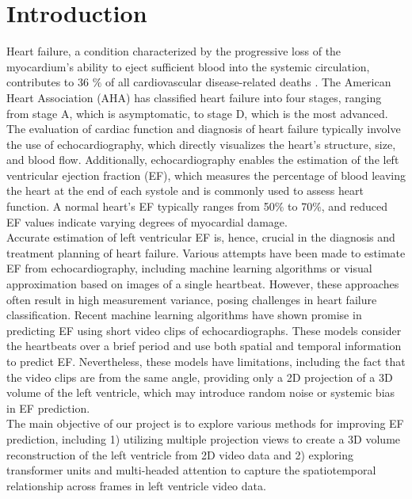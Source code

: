 \documentclass{article}
\begin{document}
\maketitle

\section{Introduction}\label{sec1}

\noindent
Heart failure, a condition characterized by the progressive loss of the myocardium's ability to eject sufficient blood into the systemic circulation, contributes to 36 $\%$ of all cardiovascular disease-related deaths \cite{heartStats}. The American Heart Association (AHA) has classified heart failure into four stages, ranging from stage A, which is asymptomatic, to stage D, which is the most advanced. The evaluation of cardiac function and diagnosis of heart failure typically involve the use of echocardiography, which directly visualizes the heart's structure, size, and blood flow. Additionally, echocardiography enables the estimation of the left ventricular ejection fraction (EF), which measures the percentage of blood leaving the heart at the end of each systole and is commonly used to assess heart function. A normal heart's EF typically ranges from 50$\%$ to 70$\%$, and reduced EF values indicate varying degrees of myocardial damage.
\\

\noindent
Accurate estimation of left ventricular EF is, hence, crucial in the diagnosis and treatment planning of heart failure. Various attempts have been made to estimate EF from echocardiography, including machine learning algorithms or visual approximation based on images of a single heartbeat. However, these approaches often result in high measurement variance, posing challenges in heart failure classification. Recent machine learning algorithms have shown promise in predicting EF using short video clips of echocardiographs. \cite{echonet1} These models consider the heartbeats over a brief period and use both spatial and temporal information to predict EF. Nevertheless, these models have limitations, including the fact that the video clips are from the same angle, providing only a 2D projection of a 3D volume of the left ventricle, which may introduce random noise or systemic bias in EF prediction.
\\

\noindent
The main objective of our project is to explore various methods for improving EF prediction, including 1) utilizing multiple projection views to create a 3D volume reconstruction of the left ventricle from 2D video data and 2) exploring transformer units and multi-headed attention to capture the spatiotemporal relationship across frames in left ventricle video data. 
\\
\end{document}
